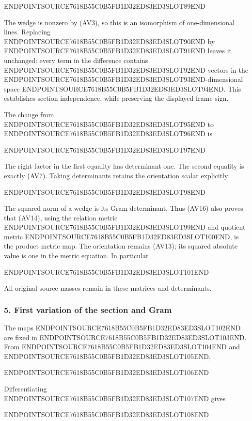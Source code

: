 ENDPOINTSOURCE7618B55C0B5FB1D32ED83ED3SLOT89END

The wedge is nonzero by (AV3), so this is an isomorphism of one-dimensional lines. Replacing ENDPOINTSOURCE7618B55C0B5FB1D32ED83ED3SLOT90END by ENDPOINTSOURCE7618B55C0B5FB1D32ED83ED3SLOT91END leaves it unchanged: every term in the difference contains ENDPOINTSOURCE7618B55C0B5FB1D32ED83ED3SLOT92END vectors in the ENDPOINTSOURCE7618B55C0B5FB1D32ED83ED3SLOT93END-dimensional space ENDPOINTSOURCE7618B55C0B5FB1D32ED83ED3SLOT94END. This establishes section independence, while preserving the displayed frame sign.

The change from ENDPOINTSOURCE7618B55C0B5FB1D32ED83ED3SLOT95END to ENDPOINTSOURCE7618B55C0B5FB1D32ED83ED3SLOT96END is

ENDPOINTSOURCE7618B55C0B5FB1D32ED83ED3SLOT97END

The right factor in the first equality has determinant one. The second equality is exactly (AV7). Taking determinants retains the orientation scalar explicitly:

ENDPOINTSOURCE7618B55C0B5FB1D32ED83ED3SLOT98END

The squared norm of a wedge is its Gram determinant. Thus (AV16) also proves that (AV14), using the relation metric ENDPOINTSOURCE7618B55C0B5FB1D32ED83ED3SLOT99END and quotient metric ENDPOINTSOURCE7618B55C0B5FB1D32ED83ED3SLOT100END, is the product metric map. The orientation remains (AV13); its squared absolute value is one in the metric equation. In particular

ENDPOINTSOURCE7618B55C0B5FB1D32ED83ED3SLOT101END

All original source masses remain in these matrices and determinants.

\subsubsection{5. First variation of the section and Gram}\label{endpoint-variation_review--first-variation-of-the-section-and-gram}

The maps ENDPOINTSOURCE7618B55C0B5FB1D32ED83ED3SLOT102END are fixed in ENDPOINTSOURCE7618B55C0B5FB1D32ED83ED3SLOT103END. From ENDPOINTSOURCE7618B55C0B5FB1D32ED83ED3SLOT104END and ENDPOINTSOURCE7618B55C0B5FB1D32ED83ED3SLOT105END,

ENDPOINTSOURCE7618B55C0B5FB1D32ED83ED3SLOT106END

Differentiating ENDPOINTSOURCE7618B55C0B5FB1D32ED83ED3SLOT107END gives

ENDPOINTSOURCE7618B55C0B5FB1D32ED83ED3SLOT108END


